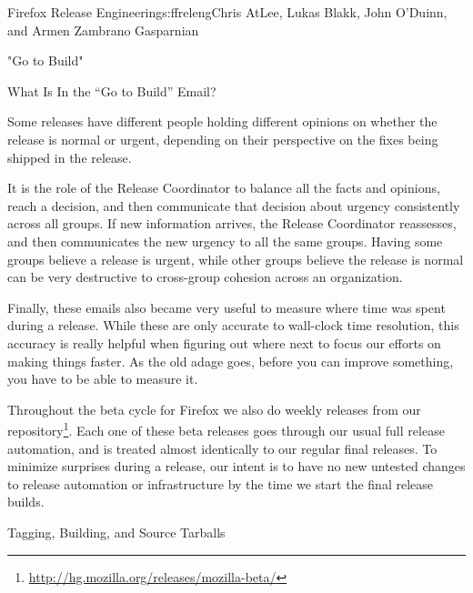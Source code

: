 \begin{aosachapter}{Firefox Release Engineering}{s:ffreleng}{Chris AtLee, Lukas Blakk, John O'Duinn, and Armen Zambrano Gasparnian}
\begin{aosasect1}{"Go to Build"}
\begin{aosasect2}{What Is In the ``Go to Build'' Email?}
\begin{aosaenumerate}
\begin{aosaenumerate2}
    \item Some releases have different people holding different
      opinions on whether the release is normal or urgent,
      depending on their perspective on the fixes being shipped in the
      release.

  \end{aosaenumerate2}

\end{aosaenumerate}

It is the role of the Release Coordinator to balance all the facts and
opinions, reach a decision, and then communicate that decision about
urgency consistently across all groups. If new information arrives,
the Release Coordinator reassesses, and then communicates the new
urgency to all the same groups. Having some groups believe a release
is urgent, while other groups believe the release is normal
can be very destructive to cross-group cohesion across an
organization.

Finally, these emails also became very useful to measure where time
was spent during a release.  While these are only accurate to
wall-clock time resolution, this accuracy is really helpful when
figuring out where next to focus our efforts on making things faster.
As the old adage goes, before you can improve something, you
have to be able to measure it.

Throughout the beta cycle for Firefox we also do weekly releases from
our 
repository\footnote{\url{http://hg.mozilla.org/releases/mozilla-beta/}}. Each
one of these beta releases goes through our usual full release
automation, and is treated almost identically to our regular final
releases. To minimize surprises during a release, our intent is to
have no new untested changes to release automation or
infrastructure by the time we start the final release builds.

\end{aosasect2}

\end{aosasect1}

\begin{aosasect1}{Tagging, Building, and Source Tarballs}

    

\end{aosasect1}
\end{aosachapter}
